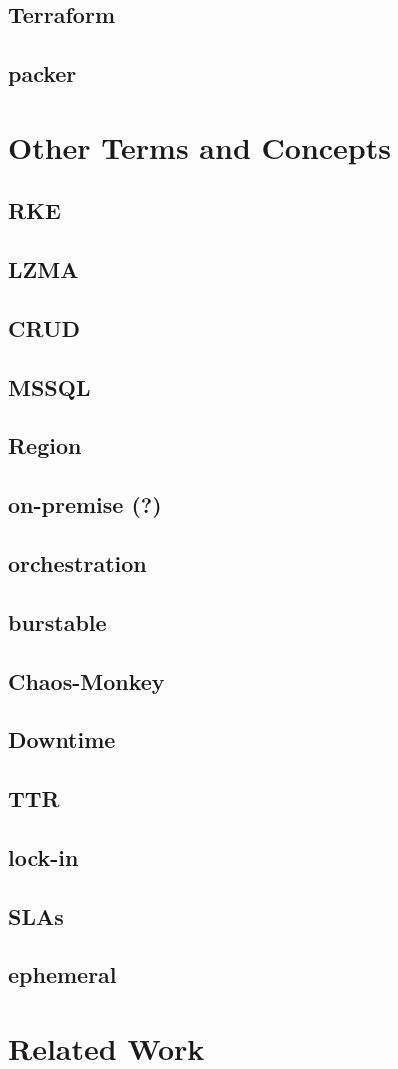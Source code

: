 \section{Terraform}
\section{packer}


\chapter{Other Terms and Concepts}
\section*{RKE}
\section*{LZMA}
\section*{CRUD}
\section*{MSSQL}
\section*{Region}
\section*{on-premise (?)}
\section*{orchestration}
\section*{burstable}
\section*{Chaos-Monkey}
\section*{Downtime}
\section*{TTR}
\section*{lock-in}
\section*{SLAs}
\section*{ephemeral}

\chapter{Related Work}
